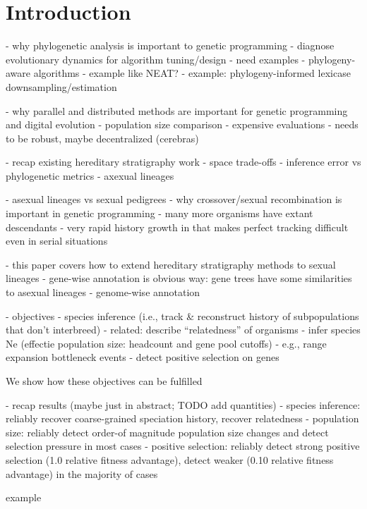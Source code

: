\section{Introduction} \label{sec:introduction}

- why phylogenetic analysis is important to genetic programming
  - diagnose evolutionary dynamics for algorithm tuning/design
    - need examples
  - phylogeny-aware algorithms
    - example like NEAT?
    - example: phylogeny-informed lexicase downsampling/estimation

- why parallel and distributed methods are important for genetic programming and digital evolution
  - population size comparison
  - expensive evaluations
  - needs to be robust, maybe decentralized (cerebras)

- recap existing hereditary stratigraphy work
  - space trade-offs
  - inference error vs phylogenetic metrics
  - axexual lineages

- asexual lineages vs sexual pedigrees
  - why crossover/sexual recombination is important in genetic programming
  - many more organisms have extant descendants
  - very rapid history growth in that makes perfect tracking difficult even in serial situations

- this paper covers how to extend hereditary stratigraphy methods to sexual lineages
  - gene-wise annotation is obvious way: gene trees have some similarities to asexual lineages
  - genome-wise annotation

- objectives
  - species inference (i.e., track \& reconstruct history of subpopulations that don't interbreed)
    - related: describe ``relatedness'' of organisms
  - infer species Ne (effectie population size: headcount and gene pool cutoffs)
    - e.g., range expansion bottleneck events
  - detect positive selection on genes

We show how these objectives can be fulfilled



- recap results (maybe just in abstract; TODO add quantities)
  - species inference: reliably recover coarse-grained speciation history, recover relatedness
  - population size: reliably detect order-of magnitude population size changes and detect selection pressure in most cases
  - positive selection: reliably detect strong positive selection (1.0 relative fitness advantage), detect weaker (0.10 relative fitness advantage) in the majority of cases

example \citep{gagliardi2019international}
